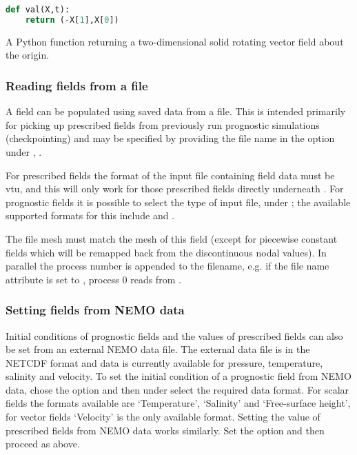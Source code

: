 \begin{example}
  \begin{lstlisting}[language=Python]
def val(X,t):
    return (-X[1],X[0])
  \end{lstlisting}
  \caption{A Python function returning a two-dimensional solid rotating
    vector field about the origin.}
\end{example}

\subsubsection{Reading fields from a file}
A field can be populated using saved data from a file. This is intended primarily
for picking up prescribed fields from previously run prognostic simulations
(checkpointing) and may be specified by providing the file name in
the  option under ,
.

For prescribed fields the format of the input file containing field data must be
vtu, and this will only work for those prescribed fields directly underneath
. For prognostic fields it is possible to select
the type of input file, under ;
the available supported formats for this include  and .

The file mesh must match the mesh of this field (except for piecewise constant
fields which will be remapped back from the discontinuous nodal values). In
parallel the process number is appended to the filename, e.g. if the file name
attribute is set to , process 0 reads from .

\subsubsection{Setting fields from NEMO data}\label{Sect:setting_from_nemo}
Initial conditions of prognostic fields and the values of prescribed fields can also be set from an external NEMO
data file. The external data file is in the NETCDF format and data is currently available for pressure, temperature, salinity
and velocity. To set the initial condition of a prognostic field from NEMO data, chose the option 
 and then under  select the required data format. For scalar fields
the formats available are `Temperature', `Salinity' and `Free-surface height', for vector fields `Velocity' is the only available format.
Setting the value of prescribed fields from NEMO data works similarly. Set the option  and then proceed as above.

